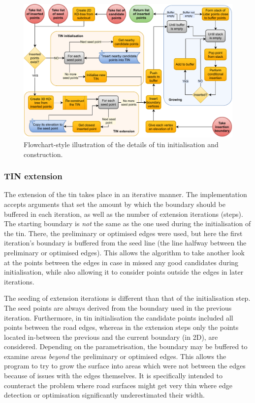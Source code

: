 \begin{figure}
    \centering
    \includegraphics[width=\linewidth]{final_report/figs/tin_construction_details.pdf}
    \caption{Flowchart-style illustration of the details of \ac{tin} initialisation and construction.}
    \label{fig:tinconstructiondetailsflow}
\end{figure}

\subsubsection{TIN extension}

The extension of the \ac{tin} takes place in an iterative manner. The implementation accepts arguments that set the amount by which the boundary should be buffered in each iteration, as well as the number of extension iterations (steps). The starting boundary is \textit{not} the same as the one used during the initialisation of the \ac{tin}. There, the preliminary or optimised edges were used, but here the first iteration's boundary is buffered from the seed line (the line halfway between the preliminary or optimised edges). This allows the algorithm to take another look at the points between the edges in case in missed any good candidates during initialisation, while also allowing it to consider points outside the edges in later iterations.

The seeding of extension iterations is different than that of the initialisation step. The seed points are always derived from the boundary used in the previous iteration. Furthermore, in \ac{tin} initialisation the candidate points included all points between the road edges, whereas in the extension steps only the points located in-between the previous and the current boundary (in 2D), are considered. Depending on the parametrisation, the boundary may be buffered to examine areas \textit{beyond} the preliminary or optimised edges. This allows the program to try to grow the surface into areas which were not between the edges because of issues with the edges themselves. It is specifically intended to counteract the problem where road surfaces might get very thin where edge detection or optimisation significantly underestimated their width.

